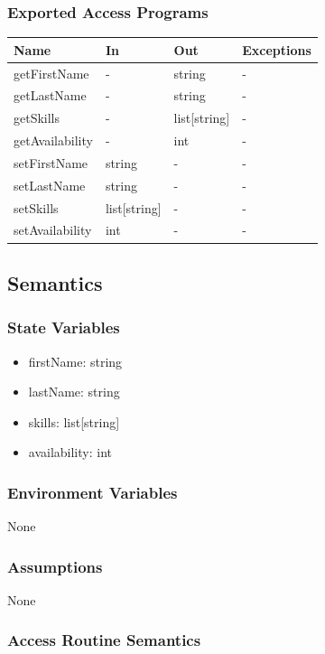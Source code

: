 \documentclass[12pt, titlepage]{article}
\begin{document}
\subsubsection{Exported Access Programs}

\begin{center}
\begin{tabular}{p{3cm} p{4cm} p{4cm} p{2cm}}
\hline
\textbf{Name} & \textbf{In} & \textbf{Out} & \textbf{Exceptions} \\
\hline
getFirstName & - & string & - \\
getLastName & - & string & - \\
getSkills & - & list[string] & - \\
getAvailability & - & int & - \\
setFirstName & string & - & - \\
setLastName & string & - & - \\
setSkills & list[string] & - & - \\
setAvailability & int & - & - \\
\hline
\end{tabular}
\end{center}

\subsection{Semantics}

\subsubsection{State Variables}
\begin{itemize}
    \item firstName: string
    \item lastName: string
    \item skills: list[string]
    \item availability: int
\end{itemize}
\subsubsection{Environment Variables}
None

\subsubsection{Assumptions}
None

\subsubsection{Access Routine Semantics}
\end{document}
